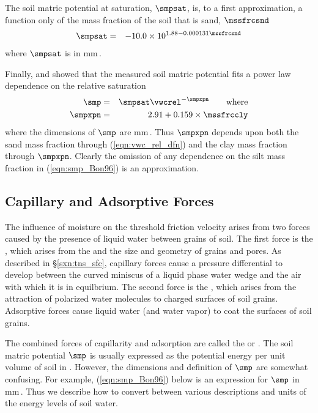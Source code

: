 \documentclass[12pt,twoside]{book}
\begin{document}
The soil matric potential at saturation, $\smpsat$, is, to a first
approximation, a function only of the mass fraction of the soil that
is sand, $\mssfrcsnd$
\begin{eqnarray}
\smpsat & = & -10.0 \times 10^{1.88 - 0.000131 \mssfrcsnd }
\label{eqn:smp_sat_Bon96}
\end{eqnarray}
where $\smpsat$ is in mm\,\HdO.

Finally, \cite{ClH78} and \cite{CHC84}
showed that the measured soil matric potential fits a power law
dependence on the relative saturation
\begin{eqnarray}
\label{eqn:smp_Bon96}
\smp & = & \smpsat \vwcrel^{-\smpxpn}
\qquad \mbox{where} \\
\label{eqn:smp_xpn_Bon96}
\smpxpn & = & 2.91 + 0.159 \times \mssfrccly 
\end{eqnarray}
where the dimensions of $\smp$ are mm\,\HdO.
Thus $\smpxpn$ depends upon both the sand mass fraction through
\vwcrel (\ref{eqn:vwc_rel_dfn}) and the clay mass fraction through
$\smpxpn$. 
Clearly the omission of any dependence on the silt mass fraction in
(\ref{eqn:smp_Bon96}) is an approximation.

\subsection[Capillary and Adsorptive Forces]{Capillary and Adsorptive Forces}\label{sxn:cpl}
The influence of moisture on the threshold friction velocity arises
from two forces caused by the presence of liquid water between grains
of soil.
The first force is the , which arises from the
 and the size and geometry of grains
and pores.
As described in \S\ref{sxn:tns_sfc}, capillary forces cause a
pressure differential to develop between the curved miniscus of a
liquid phase water wedge and the air with which it is in equilbrium. 
The second force is the , which arises from
the attraction of polarized water molecules to charged surfaces of
soil grains.
Adsorptive forces cause liquid water (and water vapor) to coat the
surfaces of soil grains.

The combined forces of capillarity and adsorption are called the 
 or . 
The soil matric potential $\smp$ is usually expressed as the
potential energy per unit volume of soil in \jxkg.
However, the dimensions and definition of $\smp$ are somewhat
confusing. 
For example, (\ref{eqn:smp_Bon96}) below is an expression for $\smp$
in mm\,\HdO. 
Thus we describe how to convert between various descriptions and units
of the energy levels of soil water. 
\end{document}
